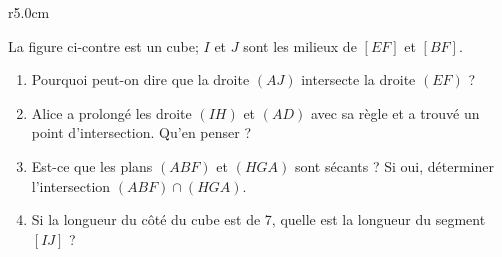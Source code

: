 
\begin{exercice}[\ldots/5]\label{exosmath-0634}

\begin{wrapfigure}{r}{5.0cm}
   \vspace{-1cm}        %
   \centering
   
\end{wrapfigure}

La figure ci-contre est un cube; \( I\) et \( J\) sont les milieux de \( [EF]\) et \( [BF]\).
\begin{enumerate}
    \item
        Pourquoi peut-on dire que la droite \( (AJ)\) intersecte la droite \( (EF)\) ?
    \item
        Alice a prolongé les droite \( (IH)\) et \( (AD)\) avec sa règle et a trouvé un point d'intersection. Qu'en penser ? 
    \item
        Est-ce que les plans \( (ABF) \) et \( (HGA)\) sont sécants ? Si oui, déterminer l'intersection \( (ABF)\cap (HGA)\).
    \item
        Si la longueur du côté du cube est de \unit{7}{\kilo\meter}, quelle est la longueur du segment \( [IJ]\) ?
\end{enumerate}


\end{exercice}
